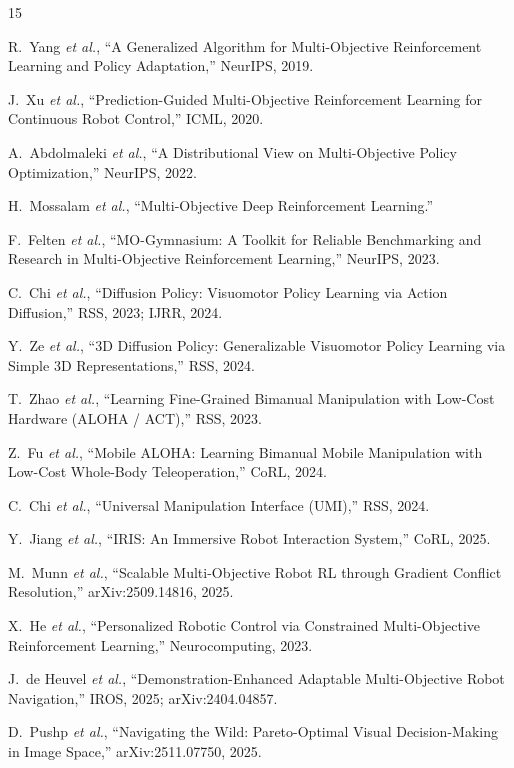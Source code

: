 \documentclass[11pt,a4paper]{article}
\begin{document}
\begin{thebibliography}{15}

R.~Yang \emph{et al.},
``A Generalized Algorithm for Multi-Objective Reinforcement Learning
and Policy Adaptation,''
NeurIPS, 2019.

J.~Xu \emph{et al.},
``Prediction-Guided Multi-Objective Reinforcement Learning for
Continuous Robot Control,''
ICML, 2020.

A.~Abdolmaleki \emph{et al.},
``A Distributional View on Multi-Objective Policy Optimization,''
NeurIPS, 2022.

H.~Mossalam \emph{et al.},
``Multi-Objective Deep Reinforcement Learning.''

F.~Felten \emph{et al.},
``MO-Gymnasium: A Toolkit for Reliable Benchmarking and Research in
Multi-Objective Reinforcement Learning,''
NeurIPS, 2023.

C.~Chi \emph{et al.},
``Diffusion Policy: Visuomotor Policy Learning via Action Diffusion,''
RSS, 2023; IJRR, 2024.

Y.~Ze \emph{et al.},
``3D Diffusion Policy: Generalizable Visuomotor Policy Learning via
Simple 3D Representations,''
RSS, 2024.

T.~Zhao \emph{et al.},
``Learning Fine-Grained Bimanual Manipulation with Low-Cost Hardware
(ALOHA / ACT),''
RSS, 2023.

Z.~Fu \emph{et al.},
``Mobile ALOHA: Learning Bimanual Mobile Manipulation with Low-Cost
Whole-Body Teleoperation,''
CoRL, 2024.

C.~Chi \emph{et al.},
``Universal Manipulation Interface (UMI),''
RSS, 2024.

Y.~Jiang \emph{et al.},
``IRIS: An Immersive Robot Interaction System,''
CoRL, 2025.

M.~Munn \emph{et al.},
``Scalable Multi-Objective Robot RL through Gradient Conflict
Resolution,''
arXiv:2509.14816, 2025.

X.~He \emph{et al.},
``Personalized Robotic Control via Constrained Multi-Objective
Reinforcement Learning,''
Neurocomputing, 2023.

J.~de Heuvel \emph{et al.},
``Demonstration-Enhanced Adaptable Multi-Objective Robot Navigation,''
IROS, 2025; arXiv:2404.04857.

D.~Pushp \emph{et al.},
``Navigating the Wild: Pareto-Optimal Visual Decision-Making in Image
Space,''
arXiv:2511.07750, 2025.

\end{thebibliography}
\end{document}
